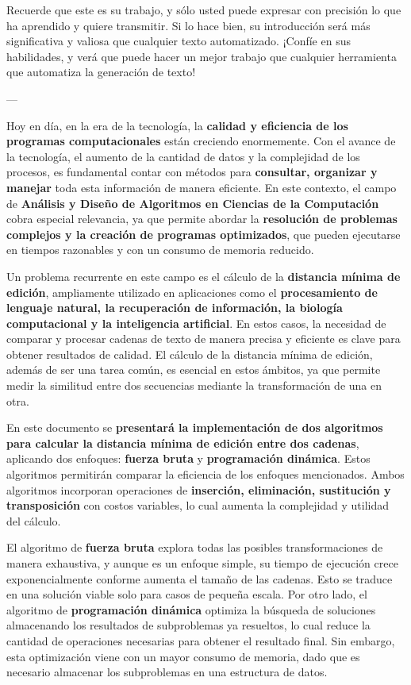 \begin{mdframed}
Recuerde que este es su trabajo, y sólo usted puede expresar con precisión lo que ha aprendido y quiere transmitir. Si lo hace bien, su introducción será más significativa y valiosa que cualquier texto automatizado. ¡Confíe en sus habilidades, y verá que puede hacer un mejor trabajo que cualquier herramienta que automatiza la generación de texto!
\end{mdframed}

---
 
Hoy en día, en la era de la tecnología, la \textbf{calidad y eficiencia de los programas computacionales} están creciendo enormemente. Con el avance de la tecnología, el aumento de la cantidad de datos y la complejidad de los procesos, es fundamental contar con métodos para \textbf{consultar, organizar y manejar} toda esta información de manera eficiente. En este contexto, el campo de \textbf{Análisis y Diseño de Algoritmos en Ciencias de la Computación} cobra especial relevancia, ya que permite abordar la \textbf{resolución de problemas complejos y la creación de programas optimizados}, que pueden ejecutarse en tiempos razonables y con un consumo de memoria reducido.

Un problema recurrente en este campo es el cálculo de la \textbf{distancia mínima de edición}, ampliamente utilizado en aplicaciones como el \textbf{procesamiento de lenguaje natural, la recuperación de información, la biología computacional y la inteligencia artificial}. En estos casos, la necesidad de comparar y procesar cadenas de texto de manera precisa y eficiente es clave para obtener resultados de calidad. El cálculo de la distancia mínima de edición, además de ser una tarea común, es esencial en estos ámbitos, ya que permite medir la similitud entre dos secuencias mediante la transformación de una en otra.

En este documento se \textbf{presentará la implementación de dos algoritmos para calcular la distancia mínima de edición entre dos cadenas}, aplicando dos enfoques: \textbf{fuerza bruta} y \textbf{programación dinámica}. Estos algoritmos permitirán comparar la eficiencia de los enfoques mencionados. Ambos algoritmos incorporan operaciones de \textbf{inserción, eliminación, sustitución y transposición} con costos variables, lo cual aumenta la complejidad y utilidad del cálculo.

El algoritmo de \textbf{fuerza bruta} explora todas las posibles transformaciones de manera exhaustiva, y aunque es un enfoque simple, su tiempo de ejecución crece exponencialmente conforme aumenta el tamaño de las cadenas. Esto se traduce en una solución viable solo para casos de pequeña escala. Por otro lado, el algoritmo de \textbf{programación dinámica} optimiza la búsqueda de soluciones almacenando los resultados de subproblemas ya resueltos, lo cual reduce la cantidad de operaciones necesarias para obtener el resultado final. Sin embargo, esta optimización viene con un mayor consumo de memoria, dado que es necesario almacenar los subproblemas en una estructura de datos.


